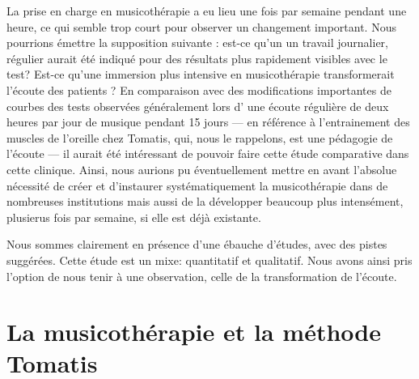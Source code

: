  
 La prise en charge en musicothérapie a eu lieu
  une fois par semaine pendant une heure, ce qui semble trop court pour observer un changement important. Nous pourrions émettre la supposition suivante :  est-ce qu'un un travail journalier, régulier aurait été indiqué pour des résultats plus rapidement visibles avec le test?
  Est-ce qu'une immersion plus intensive en musicothérapie transformerait l'écoute des patients ? 
   En comparaison avec des
  modifications importantes de courbes des tests observées généralement  lors d' une écoute
  régulière de deux heures par jour de musique pendant 15 jours --- en
  référence à l'entrainement des muscles de l'oreille chez Tomatis,
  qui, nous le rappelons, est une pédagogie de l'écoute --- il aurait
  été intéressant de pouvoir faire cette étude comparative dans cette
  clinique. Ainsi, nous aurions pu éventuellement mettre en avant
  l'absolue nécessité de créer et d'instaurer systématiquement la
  musicothérapie dans de nombreuses institutions mais aussi  de la
  développer beaucoup plus intensément, plusierus fois par semaine, si
  elle est déjà existante.
  
  Nous sommes clairement en présence d'une ébauche d'études, avec des pistes
  suggérées. 
  Cette étude est un mixe: quantitatif et qualitatif. Nous avons ainsi pris l'option de nous tenir à une
  observation, celle de la transformation de l'écoute.
  



  







\section{La musicothérapie et la méthode Tomatis}


